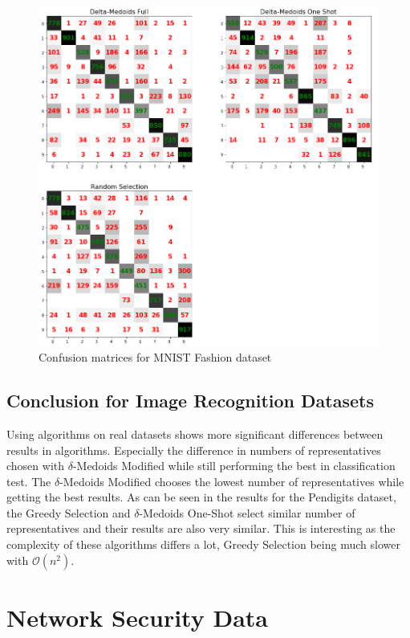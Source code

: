 \documentclass[thesis=B,english]{FITthesis}[2012/10/20]
\begin{document}
\begin{figure}[t]
   \includegraphics[width=\linewidth]{img/exp3_mnist_fashion.png}
  \caption{Confusion matrices for MNIST Fashion dataset}
  \label{img:exp4}
\end{figure}

\subsection{Conclusion for Image Recognition Datasets}
Using algorithms on real datasets shows more significant differences between results in algorithms.
Especially the difference in numbers of representatives chosen with $\delta$-Medoids Modified while still performing the best in classification test.
The $\delta$-Medoids Modified chooses the lowest number of representatives while getting the best results.
As can be seen in the results for the Pendigits dataset, the Greedy Selection and $\delta$-Medoids One-Shot select similar number of representatives and their results are also very similar.
This is interesting as the complexity of these algorithms differs a lot, Greedy Selection being much slower with $\mathcal{O}(n^2)$.

\section{Network Security Data}\label{sec:exp4}
\end{document}
